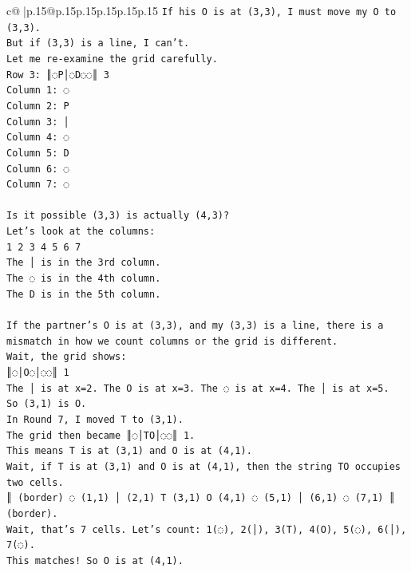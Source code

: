 \documentclass{article}
\begin{document}
{\begin{supertabular}{c@{$\;$}|p{.15\linewidth}@{}p{.15\linewidth}p{.15\linewidth}p{.15\linewidth}p{.15\linewidth}p{.15\linewidth}}
{{{\texttt{If his O is at (3,3), I must move my O to (3,3).} \\
\texttt{But if (3,3) is a line, I can't.} \\
\texttt{Let me re{-}examine the grid carefully.} \\
\texttt{Row 3: ║◌P│◌D◌◌║ 3} \\
\texttt{Column 1: ◌} \\
\texttt{Column 2: P} \\
\texttt{Column 3: │} \\
\texttt{Column 4: ◌} \\
\texttt{Column 5: D} \\
\texttt{Column 6: ◌} \\
\texttt{Column 7: ◌} \\
\\ 
\texttt{Is it possible (3,3) is actually (4,3)?} \\
\texttt{Let's look at the columns:} \\
\texttt{1 2 3 4 5 6 7} \\
\texttt{The │ is in the 3rd column.} \\
\texttt{The ◌ is in the 4th column.} \\
\texttt{The D is in the 5th column.} \\
\\ 
\texttt{If the partner's O is at (3,3), and my (3,3) is a line, there is a mismatch in how we count columns or the grid is different.} \\
\texttt{Wait, the grid shows:} \\
\texttt{║◌│O◌│◌◌║ 1} \\
\texttt{The │ is at x=2. The O is at x=3. The ◌ is at x=4. The │ is at x=5.} \\
\texttt{So (3,1) is O.} \\
\texttt{In Round 7, I moved T to (3,1).} \\
\texttt{The grid then became ║◌│TO│◌◌║ 1.} \\
\texttt{This means T is at (3,1) and O is at (4,1).} \\
\texttt{Wait, if T is at (3,1) and O is at (4,1), then the string TO occupies two cells.} \\
\texttt{║ (border) ◌ (1,1) │ (2,1) T (3,1) O (4,1) ◌ (5,1) │ (6,1) ◌ (7,1) ║ (border).} \\
\texttt{Wait, that's 7 cells. Let's count: 1(◌), 2(│), 3(T), 4(O), 5(◌), 6(│), 7(◌).} \\
\texttt{This matches! So O is at (4,1).} \\
}}}
\end{supertabular}}
\end{document}
